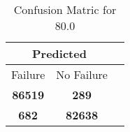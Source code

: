 \begin{table}[] 
\caption{Confusion Matric for 80.0} 
\label{Table: Prediction Accuracy-DMD80.0OnlySunEKF-ignoreReflectionEKF-top2perfectNoFailurePrediction-Reflection} 
\centering 
\begin{tabular} 
 {@{}ccc@{}} 
\toprule 
\multicolumn{2}{c}{\textbf{Predicted}}
 \\ \midrule 
\multicolumn{1}{|c|}{Failure} & 
\multicolumn{1}{c|}{No Failure}
 \\ \midrule 
\multicolumn{1}{|c|}{\color{green}\textbf{86519}} & 
\multicolumn{1}{c|}{\color{red}\textbf{289}}
 \\ \midrule 
\multicolumn{1}{|c|}{\color{red}\textbf{682}} & 
\multicolumn{1}{c|}{\color{green}\textbf{82638}}
 \\ \bottomrule 
\end{tabular} 
\end{table} 
